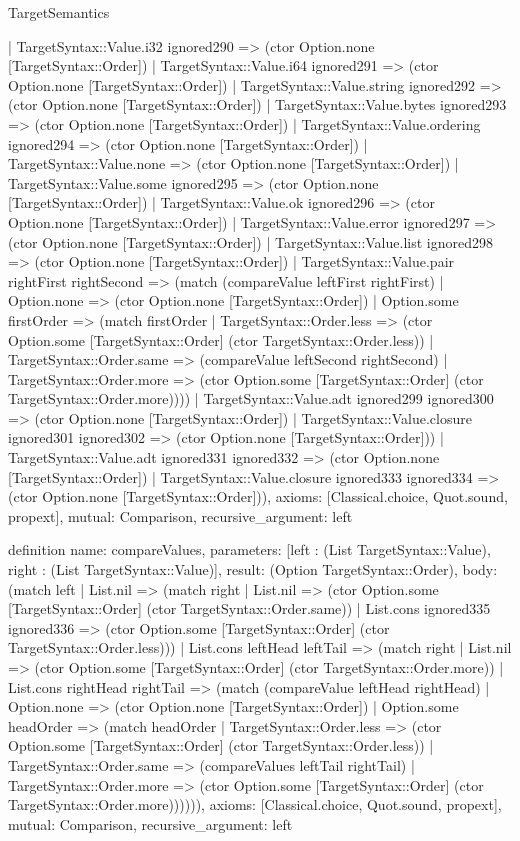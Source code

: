 \begin{lexlean}{TargetSemantics}
\begin{semanticmodule}
{      | TargetSyntax::Value.i32 ignored290 => (ctor Option.none [TargetSyntax::Order])
      | TargetSyntax::Value.i64 ignored291 => (ctor Option.none [TargetSyntax::Order])
      | TargetSyntax::Value.string ignored292 => (ctor Option.none [TargetSyntax::Order])
      | TargetSyntax::Value.bytes ignored293 => (ctor Option.none [TargetSyntax::Order])
      | TargetSyntax::Value.ordering ignored294 => (ctor Option.none [TargetSyntax::Order])
      | TargetSyntax::Value.none => (ctor Option.none [TargetSyntax::Order])
      | TargetSyntax::Value.some ignored295 => (ctor Option.none [TargetSyntax::Order])
      | TargetSyntax::Value.ok ignored296 => (ctor Option.none [TargetSyntax::Order])
      | TargetSyntax::Value.error ignored297 => (ctor Option.none [TargetSyntax::Order])
      | TargetSyntax::Value.list ignored298 => (ctor Option.none [TargetSyntax::Order])
      | TargetSyntax::Value.pair rightFirst rightSecond => (match (compareValue leftFirst rightFirst)
        | Option.none => (ctor Option.none [TargetSyntax::Order])
        | Option.some firstOrder => (match firstOrder
          | TargetSyntax::Order.less => (ctor Option.some [TargetSyntax::Order] (ctor TargetSyntax::Order.less))
          | TargetSyntax::Order.same => (compareValue leftSecond rightSecond)
          | TargetSyntax::Order.more => (ctor Option.some [TargetSyntax::Order] (ctor TargetSyntax::Order.more))))
      | TargetSyntax::Value.adt ignored299 ignored300 => (ctor Option.none [TargetSyntax::Order])
      | TargetSyntax::Value.closure ignored301 ignored302 => (ctor Option.none [TargetSyntax::Order]))
    | TargetSyntax::Value.adt ignored331 ignored332 => (ctor Option.none [TargetSyntax::Order])
    | TargetSyntax::Value.closure ignored333 ignored334 => (ctor Option.none [TargetSyntax::Order])),
  axioms: [Classical.choice, Quot.sound, propext],
  mutual: Comparison,
  recursive_argument: left
}

definition{
  name: compareValues,
  parameters: [left : (List TargetSyntax::Value), right : (List TargetSyntax::Value)],
  result: (Option TargetSyntax::Order),
  body: (match left
    | List.nil => (match right
      | List.nil => (ctor Option.some [TargetSyntax::Order] (ctor TargetSyntax::Order.same))
      | List.cons ignored335 ignored336 => (ctor Option.some [TargetSyntax::Order] (ctor TargetSyntax::Order.less)))
    | List.cons leftHead leftTail => (match right
      | List.nil => (ctor Option.some [TargetSyntax::Order] (ctor TargetSyntax::Order.more))
      | List.cons rightHead rightTail => (match (compareValue leftHead rightHead)
        | Option.none => (ctor Option.none [TargetSyntax::Order])
        | Option.some headOrder => (match headOrder
          | TargetSyntax::Order.less => (ctor Option.some [TargetSyntax::Order] (ctor TargetSyntax::Order.less))
          | TargetSyntax::Order.same => (compareValues leftTail rightTail)
          | TargetSyntax::Order.more => (ctor Option.some [TargetSyntax::Order] (ctor TargetSyntax::Order.more)))))),
  axioms: [Classical.choice, Quot.sound, propext],
  mutual: Comparison,
  recursive_argument: left
}


\end{semanticmodule}
\end{lexlean}

